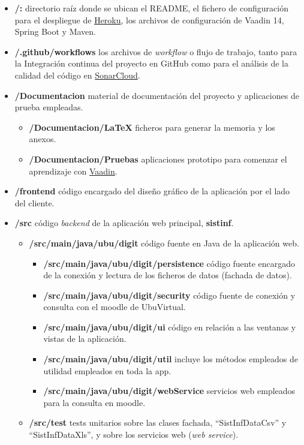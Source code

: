 \begin{itemize}
	\item \textbf{/:} directorio raíz donde se ubican el README, el fichero de configuración para el despliegue de \href{https://dashboard.heroku.com/}{Heroku}, los archivos de configuración de Vaadin 14, Spring Boot y Maven. 
	\item \textbf{/.github/workflows} los archivos de \textit{workflow} o flujo de trabajo, tanto para la Integración continua del proyecto en GitHub como para el análisis de la calidad del código en \href{https://sonarcloud.io/}{SonarCloud}.
	\item \textbf{/Documentacion} material de documentación del proyecto y aplicaciones de prueba empleadas.
		\begin{itemize}
			\tightlist
			\item \textbf{/Documentacion/LaTeX} ficheros para generar la memoria y los anexos.
			\item \textbf{/Documentacion/Pruebas} aplicaciones prototipo para comenzar el aprendizaje con \href{https://vaadin.com/}{Vaadin}.
		\end{itemize}
	\item \textbf{/frontend} código encargado del diseño gráfico de la aplicación por el lado del cliente.
	\item \textbf{/src} código \textit{backend} de la aplicación web principal, \textbf{sistinf}.
	\begin{itemize}
		\tightlist
		\item \textbf{/src/main/java/ubu/digit} código fuente en Java de la aplicación web.
			\begin{itemize}
				\item \textbf{/src/main/java/ubu/digit/persistence} código fuente encargado de la conexión y lectura de los ficheros de datos (fachada de datos).
				\item \textbf{/src/main/java/ubu/digit/security} código fuente de conexión y consulta con el moodle de UbuVirtual.
				\item \textbf{/src/main/java/ubu/digit/ui} código en relación a las ventanas y vistas de la aplicación.
				\item \textbf{/src/main/java/ubu/digit/util} incluye los métodos empleados de utilidad empleados en toda la app. 
				\item \textbf{/src/main/java/ubu/digit/webService} servicios web empleados para la consulta en moodle.
			\end{itemize}
		\item \textbf{/src/test} tests unitarios sobre las clases fachada, ``SistInfDataCsv'' y ``SistInfDataXls'', y sobre los servicios web (\emph{web service}).
	\end{itemize}
\end{itemize}

